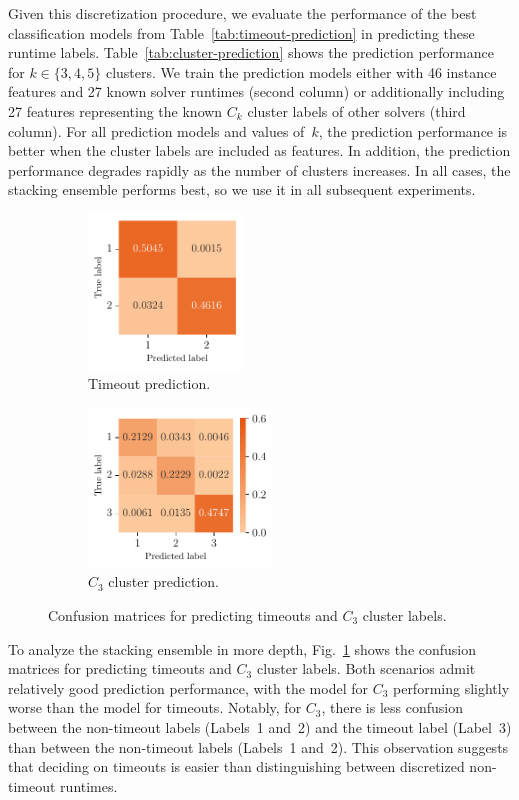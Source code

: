 \documentclass[sn-basic, Numbered]{sn-jnl} %
\begin{document}
Given this discretization procedure, we evaluate the performance of the best classification models from Table~\ref{tab:timeout-prediction} in predicting these runtime labels.
Table~\ref{tab:cluster-prediction} shows the prediction performance for $k \in \lbrace 3, 4, 5 \rbrace$ clusters.
We train the prediction models either with 46 instance features and 27 known solver runtimes (second column) or additionally including 27 features representing the known $C_k$ cluster labels of other solvers (third column).
For all prediction models and values of~$k$, the prediction performance is better when the cluster labels are included as features.
In addition, the prediction performance degrades rapidly as the number of clusters increases.
In all cases, the stacking ensemble performs best, so we use it in all subsequent experiments.

\begin{figure}[tb]
	\centering
	\begin{subfigure}{0.45\textwidth}
		\centering
		\includegraphics[height=4.123cm]{../plots/cm2labels.pdf}
		\caption{Timeout prediction.}
	\end{subfigure}
	\begin{subfigure}{0.45\textwidth}
		\centering
		\includegraphics[height=4.228cm]{../plots/cm3labels.pdf}
		\caption{$C_3$ cluster prediction.}
	\end{subfigure}
	\caption{Confusion matrices for predicting timeouts and $C_3$ cluster labels.}
	\label{fig:confusion-matrices}
\end{figure}

To analyze the stacking ensemble in more depth, Fig.~\ref{fig:confusion-matrices} shows the confusion matrices for predicting timeouts and $C_3$ cluster labels.
Both scenarios admit relatively good prediction performance, with the model for $C_3$ performing slightly worse than the model for timeouts.
Notably, for $C_3$, there is less confusion between the non-timeout labels (Labels~1 and~2) and the timeout label (Label~3) than between the non-timeout labels (Labels~1 and~2).
This observation suggests that deciding on timeouts is easier than distinguishing between discretized non-timeout runtimes.
\end{document}
